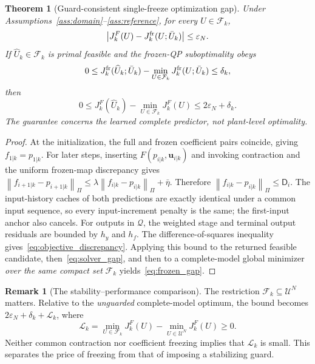 \documentclass[journal]{IEEEtran}
\theoremstyle{plain}
\newtheorem{theorem}{Theorem}
\theoremstyle{definition}
\newtheorem{remark}{Remark}
\newcommand{\vu}{\mathbf{u}}
\newcommand{\norm}[1]{\left\lVert #1\right\rVert}
\begin{document}
\begin{theorem}[Guard-consistent single-freeze optimization gap]
\label{thm:frozen_gap}
Under Assumptions~\ref{ass:domain}--\ref{ass:reference}, for every $U\in\mathcal F_k$,
\begin{equation}
\left|J_k^F(U)-J_k^{\rm fr}(U;\bar U_k)\right|
\le\varepsilon_N.
\label{eq:objective_discrepancy}
\end{equation}
If $\widehat U_k\in\mathcal F_k$ is primal feasible and the frozen-QP suboptimality obeys
\begin{equation}
0\le J_k^{\rm fr}(\widehat U_k;\bar U_k)
-\min_{U\in\mathcal F_k}J_k^{\rm fr}(U;\bar U_k)
\le\delta_k,
\label{eq:solver_gap}
\end{equation}
then
\begin{equation}
0\le J_k^F(\widehat U_k)-\min_{U\in\mathcal F_k}J_k^F(U)
\le2\varepsilon_N+\delta_k.
\label{eq:frozen_gap}
\end{equation}
The guarantee concerns the \emph{learned complete predictor}, not plant-level optimality.
\end{theorem}
\begin{proof}
At the initialization, the full and frozen coefficient pairs coincide, giving $f_{1|k}=p_{1|k}$. For later steps, inserting $F(p_{i|k},\vu_{i|k})$ and invoking contraction and the uniform frozen-map discrepancy gives $\norm{f_{i+1|k}-p_{i+1|k}}_\Pi\le\lambda\norm{f_{i|k}-p_{i|k}}_\Pi+\bar\eta$. Therefore $\norm{f_{i|k}-p_{i|k}}_\Pi\le\mathsf D_i$. The input-history caches of both predictions are exactly identical under a common input sequence, so every input-increment penalty is the same; the first-input anchor also cancels. For outputs in $\mathcal Q$, the weighted stage and terminal output residuals are bounded by $h_y$ and $h_f$. The difference-of-squares inequality gives~\eqref{eq:objective_discrepancy}. Applying this bound to the returned feasible candidate, then~\eqref{eq:solver_gap}, and then to a complete-model global minimizer \emph{over the same compact set} $\mathcal F_k$ yields~\eqref{eq:frozen_gap}.
\end{proof}

\begin{remark}[The stability--performance comparison]
The restriction $\mathcal F_k\subseteq\mathcal U^N$ matters. Relative to the \emph{unguarded} complete-model optimum, the bound becomes $2\varepsilon_N+\delta_k+\mathcal L_k$, where
\begin{equation}
\mathcal L_k=\min_{U\in\mathcal F_k}J_k^F(U)
-\min_{U\in\mathcal U^N}J_k^F(U)\ge0.
\label{eq:guard_price}
\end{equation}
Neither common contraction nor coefficient freezing implies that $\mathcal L_k$ is small. This separates the price of freezing from that of imposing a stabilizing guard.
\end{remark}
\endgroup
\end{document}
